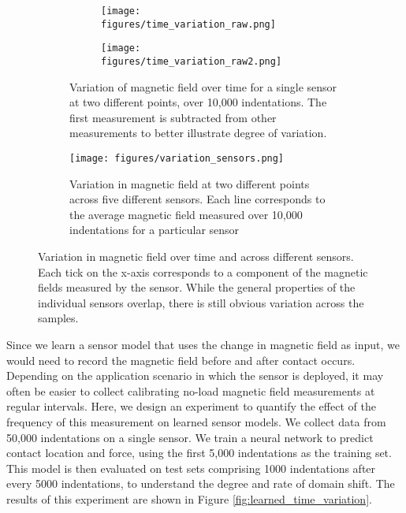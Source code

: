 \documentclass{article}
\begin{document}
\begin{figure}[h!]
    \centering
    \begin{subfigure}[t]{0.48\textwidth}
        \begin{subfigure}[t]{0.49\textwidth}
            \centering
            \texttt{[image: figures/time\_variation\_raw.png]}
        \end{subfigure}
        \begin{subfigure}[t]{0.49\textwidth}
            \centering
            \texttt{[image: figures/time\_variation\_raw2.png]}
        \end{subfigure}
    \caption{Variation of magnetic field over time for a single sensor at two different points, over 10,000 indentations. The first measurement is subtracted from other measurements to better illustrate degree of variation.}
    \label{fig:variation_time}
    \end{subfigure}
    \hfill
    \begin{subfigure}[t]{0.48\textwidth}
        \centering
        \texttt{[image: figures/variation\_sensors.png]}
         \caption{Variation in magnetic field at two different points across five different sensors. Each line corresponds to the average magnetic field measured over 10,000 indentations for a particular sensor}
         \label{fig:variation_sensors}
    \end{subfigure}
    \caption{Variation in magnetic field over time and across different sensors. Each tick on the x-axis corresponds to a component of the magnetic fields measured by the sensor. While the general properties of the individual sensors overlap, there is still obvious variation across the samples.}
    \label{fig:variation}
    \vspace{-0.1in}
\end{figure}

Since we learn a sensor model that uses the change in magnetic field as input, we would need to record the magnetic field before and after contact occurs. Depending on the application scenario in which the sensor is deployed, it may often be easier to collect calibrating no-load magnetic field measurements at regular intervals. Here, we design an experiment to quantify the effect of the frequency of this measurement on learned sensor models. We collect data from 50,000 indentations on a single sensor. We train a neural network to predict contact location and force, using the first 5,000 indentations as the training set. This model is then evaluated on test sets comprising 1000 indentations after every 5000 indentations, to understand the degree and rate of domain shift. The results of this experiment are shown in Figure \ref{fig:learned_time_variation}.
\end{document}
